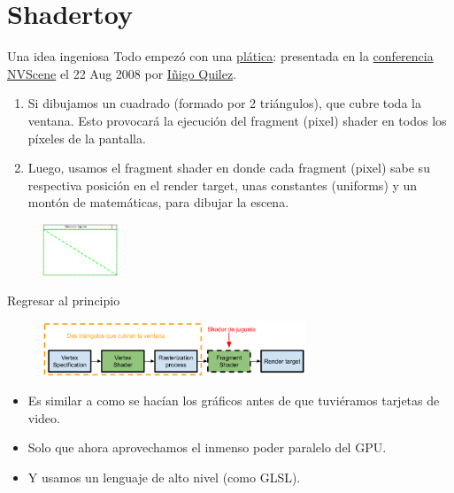 \section{Shadertoy}

\begin{frame}{Una idea ingeniosa}
Todo empezó con una \href{https://iquilezles.org/articles/nvscene2008/rwwtt.pdf}{plática}:  presentada en la \href{https://www.youtube.com/watch?v=A1iW6Z_Jc4k}{conferencia NVScene} el 22 Aug 2008 por \href{https://iquilezles.org/}{Iñigo Quilez}.
\begin{exampleblock}{}
\begin{enumerate}
    \item Si dibujamos un cuadrado (formado por 2 triángulos), que cubre toda la ventana. Esto provocará la ejecución del fragment (pixel) shader en todos los píxeles de la pantalla. 
    \item Luego, usamos el fragment shader en donde cada fragment (pixel) sabe su respectiva posición en el render target, unas constantes (uniforms) y un montón de matemáticas, para dibujar la escena.
\end{enumerate}
\end{exampleblock}
\begin{figure}[htp]
  \centering
  \includegraphics[width=0.2\textwidth]{img/TwoTriangles}
\end{figure}
\end{frame}

\begin{frame}{Regresar al principio}
\begin{figure}[htp]
  \centering
  \includegraphics[width=0.7\textwidth]{img/Truco}
\end{figure}
\begin{itemize}
    \item Es similar a como se hacían los gráficos antes de que tuviéramos tarjetas de video.
    \item Solo que ahora aprovechamos el \alert{inmenso poder paralelo} del GPU.
    \item Y usamos un lenguaje de alto nivel (como GLSL).
\end{itemize}
\end{frame}

